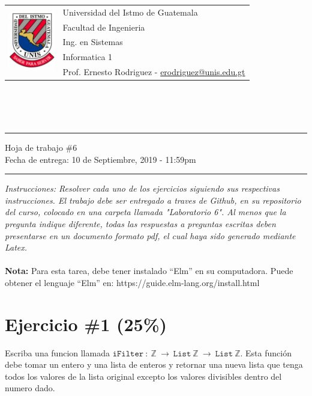\documentclass{article}
\newcommand{\horrule}[1]{\rule{\linewidth}{#1}}
\begin{document}
\begin{tabular}{l l}
\multirow{5}{*}{\includegraphics[width=2cm]{../../recursos/logo.png}}
 & Universidad del Istmo de Guatemala \\
 & Facultad de Ingenieria \\
 & Ing. en Sistemas \\
 & Informatica 1 \\
 & Prof. Ernesto Rodriguez - \href{mailto:erodriguez@unis.edu.gt}{erodriguez@unis.edu.gt} \\
\end{tabular}
\\\\\\

\begin{center}
        \horrule{0.5pt}
        \huge{Hoja de trabajo \#6} \\
        \large{Fecha de entrega: 10 de Septiembre, 2019 - 11:59pm} \\
        \horrule{1pt}
\end{center}

\emph{Instrucciones: Resolver cada uno de los ejercicios siguiendo sus respectivas
instrucciones. El trabajo debe ser entregado a traves de Github, en su repositorio del curso, colocado en una
carpeta llamada "Laboratorio 6". Al menos que la pregunta indique diferente, todas las
respuestas a preguntas escritas deben presentarse en un documento formato pdf, el cual
haya sido generado mediante Latex. }\\\\

{\bf Nota: } Para esta tarea, debe tener instalado ``Elm'' en su computadora. Puede obtener
el lenguaje ``Elm'' en: https://guide.elm-lang.org/install.html

\section*{Ejercicio \#1 (25\%)}

Escriba una funcion llamada $\mathtt{iFilter\ :\ \mathbb{Z}\ \rightarrow\ \mathtt{List}\ \mathbb{Z}\ \rightarrow\ \mathtt{List}\ \mathbb{Z}}$. Esta
funci\'on debe tomar un entero y una lista de enteros y retornar una nueva lista que tenga todos los valores de la lista
original excepto los valores divisibles dentro del numero dado.
\end{document}

